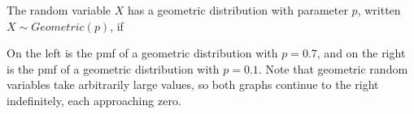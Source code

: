 \begin{defn}The random variable $X$ has a geometric distribution with parameter $p$, written $X \sim Geometric(p)$, if
\renewcommand*{\arraystretch}{1.35}
\renewcommand*{\arraystretch}{1}
\end{defn}

\par
\noindent On the left is the pmf of a geometric distribution with $p = 0.7$, and on the right is the pmf of a geometric distribution with $p=0.1$. Note that geometric random variables take arbitrarily large values, so both graphs continue to the right indefinitely, each approaching zero.

